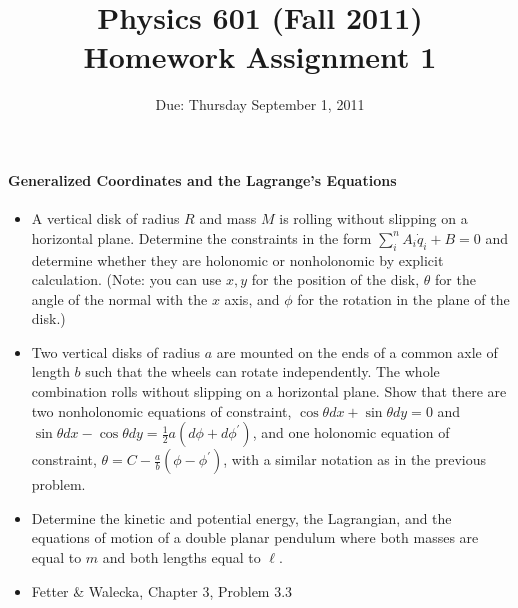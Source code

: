 \documentclass[letterpaper,11pt]{article}
\title{Physics 601 (Fall 2011) \\ Homework Assignment 1}
\date{Due: Thursday September 1, 2011}
\begin{document}
\maketitle

\paragraph*{Generalized Coordinates and the Lagrange's Equations}
\begin{itemize}
 \item A vertical disk of radius $R$ and mass $M$ is rolling without slipping on a horizontal plane.  Determine the constraints in the form $\sum_i^n A_i \dot{q}_i + B = 0$ and determine whether they are holonomic or nonholonomic by explicit calculation.  (Note: you can use $x,y$ for the position of the disk, $\theta$ for the angle of the normal with the $x$ axis, and $\phi$ for the rotation in the plane of the disk.)
 \item Two vertical disks of radius $a$ are mounted on the ends of a common axle of length $b$ such that the wheels can rotate independently.  The whole combination rolls without slipping on a horizontal plane.  Show that there are two nonholonomic equations of constraint, $\cos\theta dx + \sin\theta dy = 0$ and $\sin\theta dx - \cos\theta dy = \frac{1}{2} a (d\phi+d\phi^\prime)$, and one holonomic equation of constraint, $\theta = C - \frac{a}{b}(\phi-\phi^\prime)$, with a similar notation as in the previous problem.
 \item Determine the kinetic and potential energy, the Lagrangian, and the equations of motion of a double planar pendulum where both masses are equal to $m$ and both lengths equal to $\ell$.
 \item Fetter \& Walecka, Chapter 3, Problem 3.3
\end{itemize}
\end{document}
